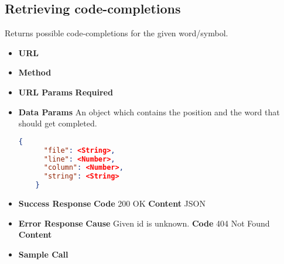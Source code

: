 \subsection{Retrieving code-completions}
Returns possible code-completions for the given word/symbol.

\begin{itemize}
\item \textbf{URL} 
\item \textbf{Method} 

\item \textbf{URL Params}
  \newline\textbf{Required} 

\item \textbf{Data Params} An object which contains the position and the word that should get completed.
  \begin{lstlisting}[basicstyle=\small,language=json]
    {
      "file": <String>,
      "line": <Number>,
      "column": <Number>,
      "string": <String>
    }
  \end{lstlisting}

\item \textbf{Success Response}
  \newline\textbf{Code} 200 OK
  \newline\textbf{Content} JSON

\item \textbf{Error Response}
  \newline\textbf{Cause} Given id is unknown.
  \newline\textbf{Code} 404 Not Found
  \newline\textbf{Content} 

\item \textbf{Sample Call}
\end{itemize}
